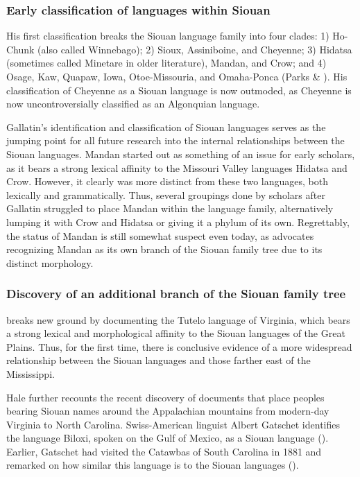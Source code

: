 \documentclass[output=paper]{LSP/langsci}
\begin{document}
\subsubsection{Early classification of languages within Siouan}

His first classification breaks the Siouan language family into four clades: 1) Ho-Chunk (also called Winnebago); 2) Sioux, Assiniboine, and Cheyenne; 3) Hidatsa (sometimes called Minetare in older literature), Mandan, and Crow; and 4) Osage, Kaw, Quapaw, Iowa, Otoe-Missouria, and Omaha-Ponca (Parks \& \citealt{Rankin2001}). His classification of Cheyenne as a Siouan language is now outmoded, as Cheyenne is now uncontroversially classified as an Algonquian language.

Gallatin's \citeyear{Gallatin1836} identification and classification of Siouan languages serves as the jumping point for all future research into the internal relationships between the Siouan languages. Mandan started out as something of an issue for early scholars, as it bears a strong lexical affinity to the Missouri Valley languages Hidatsa and Crow. However, it clearly was more distinct from these two languages, both lexically and grammatically. Thus, several groupings done by scholars after Gallatin struggled to place Mandan within the language family, alternatively lumping it with Crow and Hidatsa or giving it a phylum of its own. Regrettably, the status of Mandan is still somewhat suspect even today, as \citet{Rankin2010} advocates recognizing Mandan as its own branch of the Siouan family tree due to its distinct morphology.

\subsubsection{Discovery of an additional branch of the Siouan family tree} \citet{Hale1883} breaks new ground by documenting the Tutelo language of Virginia, which bears a strong lexical and morphological affinity to the Siouan languages of the Great Plains. Thus, for the first time, there is conclusive evidence of a more widespread relationship between the Siouan languages and those farther east of the Mississippi. 

Hale further recounts the recent discovery of documents that place peoples bearing Siouan names around the Appalachian mountains from modern-day Virginia to North Carolina. Swiss-American linguist Albert Gatschet identifies the language Biloxi, spoken on the Gulf of Mexico, as a Siouan language (\citealt{Dorsey1893}). Earlier, Gatschet had visited the Catawbas of South Carolina in 1881 and remarked on how similar this language is to the Siouan languages (\citealt{Gatschet1900}). 
\end{document}
